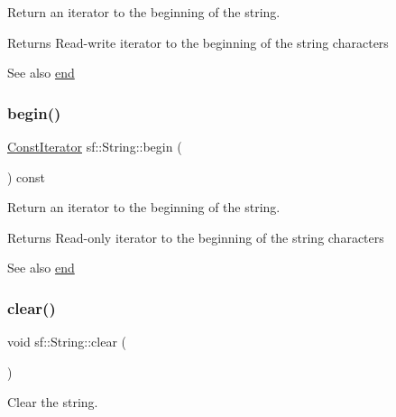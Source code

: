 Return an iterator to the beginning of the string. 

\begin{DoxyReturn}{Returns}
Read-\/write iterator to the beginning of the string characters
\end{DoxyReturn}
\begin{DoxySeeAlso}{See also}
\hyperlink{classsf_1_1_string_ac823012f39cb6f61100418876e99d53b}{end} 
\end{DoxySeeAlso}
\mbox{\label{classsf_1_1_string_a0e4755d6b4d51de7c3dc2e984b79f95d}} 
\subsubsection{\texorpdfstring{begin()}{begin()}\hspace{0.1cm}{\footnotesize\ttfamily [2/2]}}
{\footnotesize\ttfamily \hyperlink{classsf_1_1_string_a8e18efc2e8464f6eb82818902d527efa}{Const\+Iterator} sf\+::\+String\+::begin (\begin{DoxyParamCaption}{ }\end{DoxyParamCaption}) const}



Return an iterator to the beginning of the string. 

\begin{DoxyReturn}{Returns}
Read-\/only iterator to the beginning of the string characters
\end{DoxyReturn}
\begin{DoxySeeAlso}{See also}
\hyperlink{classsf_1_1_string_ac823012f39cb6f61100418876e99d53b}{end} 
\end{DoxySeeAlso}
\mbox{\label{classsf_1_1_string_a391c1b4950cbf3d3f8040cea73af2969}} 
\subsubsection{\texorpdfstring{clear()}{clear()}}
{\footnotesize\ttfamily void sf\+::\+String\+::clear (\begin{DoxyParamCaption}{ }\end{DoxyParamCaption})}



Clear the string. 

